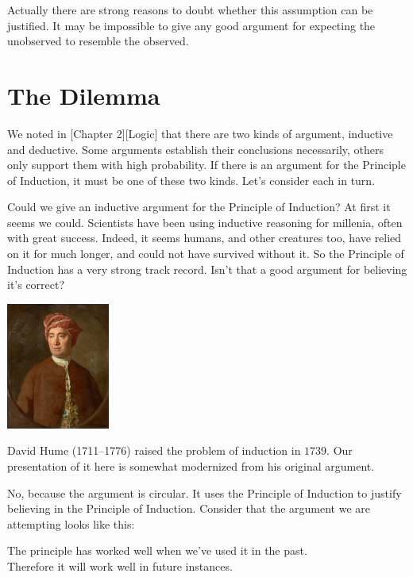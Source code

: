 \documentclass[justified]{tufte-book}
\begin{document}
Actually there are strong reasons to doubt whether this assumption can be justified. It may be impossible to give any good argument for expecting the unobserved to resemble the observed.

\hypertarget{the-dilemma}{%
\section*{The Dilemma}\label{the-dilemma}}

We noted in {[}Chapter 2{]}{[}Logic{]} that there are two kinds of argument, inductive and deductive. Some arguments establish their conclusions necessarily, others only support them with high probability. If there is an argument for the Principle of Induction, it must be one of these two kinds. Let's consider each in turn.

Could we give an inductive argument for the Principle of Induction? At first it seems we could. Scientists have been using inductive reasoning for millenia, often with great success. Indeed, it seems humans, and other creatures too, have relied on it for much longer, and could not have survived without it. So the Principle of Induction has a very strong track record. Isn't that a good argument for believing it's correct?

\begin{marginfigure}
\includegraphics[width=1.33in]{img/hume} \caption[David Hume (1711--1776) raised the problem of induction in $1739$]{David Hume (1711--1776) raised the problem of induction in $1739$. Our presentation of it here is somewhat modernized from his original argument.}\label{fig:unnamed-chunk-7}
\end{marginfigure}

No, because the argument is circular. It uses the Principle of Induction to justify believing in the Principle of Induction. Consider that the argument we are attempting looks like this:

\begin{argument}
The principle has worked well when we've used it in the past.\\
Therefore it will work well in future instances.
\end{argument}
\end{document}
